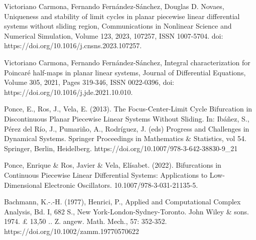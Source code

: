 \documentclass[12pt,a4paper]{report} %
\begin{document}
\begin{thebibliography}{99}
		 Victoriano Carmona, Fernando Fernández-Sánchez, Douglas D. Novaes,
		Uniqueness and stability of limit cycles in planar piecewise linear differential systems without sliding region,
		Communications in Nonlinear Science and Numerical Simulation,
		Volume 123, 2023, 107257, ISSN 1007-5704.
		doi: https://doi.org/10.1016/j.cnsns.2023.107257.
		
		 Victoriano Carmona, Fernando Fernández-Sánchez,
		Integral characterization for Poincaré half-maps in planar linear systems, Journal of Differential Equations, Volume 305, 2021, Pages 319-346, ISSN 0022-0396, doi: https://doi.org/10.1016/j.jde.2021.10.010.
		
		 Ponce, E., Ros, J., Vela, E. (2013). The Focus-Center-Limit Cycle Bifurcation in Discontinuous Planar Piecewise Linear Systems Without Sliding. In: Ibáñez, S., Pérez del Río, J., Pumariño, A., Rodríguez, J. (eds) Progress and Challenges in Dynamical Systems. Springer Proceedings in Mathematics \& Statistics, vol 54. Springer, Berlin, Heidelberg. https://doi.org/10.1007/978-3-642-38830-9\_21
		
		 Ponce, Enrique \& Ros, Javier \& Vela, Elísabet. (2022). Bifurcations in Continuous Piecewise Linear Differential Systems: Applications to Low-Dimensional Electronic Oscillators. 10.1007/978-3-031-21135-5. 
		
		 Bachmann, K.-.-H. (1977), Henrici, P., Applied and Computational Complex Analysis, Bd. I, 682 S., New York-London-Sydney-Toronto. John Wiley \& sons. 1974. £ 13,50 .. Z. angew. Math. Mech., 57: 352-352. https://doi.org/10.1002/zamm.19770570622
		
	\end{thebibliography}
	
	\newpage
	
\end{document}
